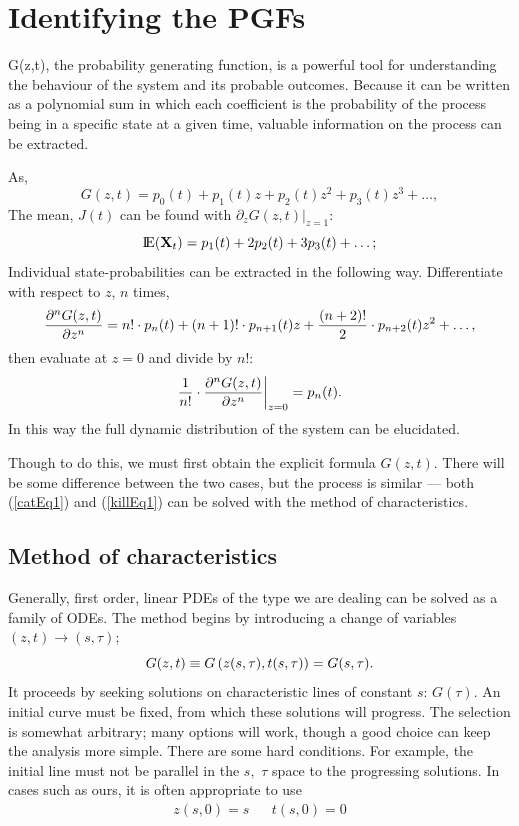 \section{Identifying the PGFs}

G(z,t), the probability generating function, is a powerful tool for understanding the behaviour of the system and its probable outcomes. Because it can be written as a polynomial sum in which each coefficient is the probability of the process being in a specific state at a given time, valuable information on the process can be extracted. \par
As,
$$G(z,t) = p_0(t) + p_1(t)z + p_2(t)z^2 + p_3(t)z^3 + \dots,$$
The mean, $J(t)$ can be found with $\partial_zG(z,t)|_{z=1}$:
$${\rm I}\!{\rm E}({{\bf X}_t}) = p_1(t) + 2p_2(t) + 3p_3(t) + \dots;$$
Individual state-probabilities can be extracted in the following way. Differentiate with respect to $z$, $n$ times,
$$\displaystyle\frac{\partial^{n} G(z,t)}{\partial {z}^{n}} =  n! \cdot p_n(t) + (n+1)! \cdot p_{n+1}(t) z + \frac{(n+2)!}{2} \cdot p_{n+2}(t) z^2 + \dots,$$
then evaluate at $z=0$ and divide by $n!$:
\begin{equation}
\label{stateFormula}
\frac{1}{n!}\cdot\displaystyle\frac{\partial^{n} G(z,t)}{\partial {z}^{n}}\bigg|_{z=0} = p_n(t).
\end{equation}
In this way the full dynamic distribution of the system can be elucidated.

Though to do this, we must first obtain the explicit formula $G(z,t)$. There will be some difference between the two cases, but the process is similar --- both (\ref{catEq1}) and (\ref{killEq1}) can be solved with the method of characteristics. 


\subsection{Method of characteristics}

Generally, first order, linear PDEs of the type we are dealing can be solved as a family of ODEs. The method begins by introducing a change of variables $(z,t)\to(s,\tau)$;
$$G(z,t)\equiv G\left( z(s, \tau),t(s,\tau)\right) = G(s, \tau).$$
It proceeds by seeking solutions on characteristic lines of constant $s$: $G(\tau)$. An initial curve must be fixed, from which these solutions will progress. The selection is somewhat arbitrary; many options will work, though a good choice can keep the analysis more simple. There are some hard conditions. For example, the initial line must not be parallel in the $s,$ $\tau$ space to the progressing solutions. In cases such as ours, it is often appropriate to use
\begin{align}
\label{ICs}
z(s,0) = s&& t(s,0) = 0
\end{align}
